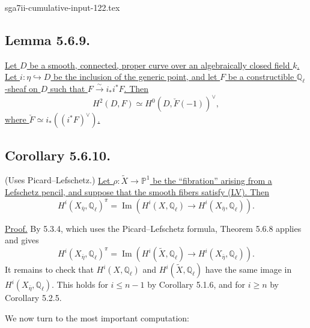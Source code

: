\begin{filecontents*}{sga7ii-cumulative-input-122.tex}
\subsection*{Lemma 5.6.9.}
\underline{Let $D$ be a smooth, connected, proper curve over an
algebraically closed field $k$.  Let $i:\eta\hookrightarrow D$ be the
inclusion of the generic point, and let $F$ be a constructible
$\mathbb Q_\ell$-sheaf on $D$ such that
$F\overset{\sim}{\longrightarrow}i_*i^*F$.  Then}
\[
H^2(D,F)\simeq H^0(D,\check F(-1))^\vee,
\]
\underline{where $\check F\simeq i_*((i^*F)^\vee)$.}

\subsection*{Corollary 5.6.10.}
\textup{(Uses Picard--Lefschetz.)}
\underline{Let $\rho:\widetilde X\to\mathbb P^1$ be the
\textquotedblleft fibration\textquotedblright{} arising from a Lefschetz
pencil, and suppose that the smooth fibers satisfy (LV).  Then}
\begin{equation}\tag{5.6.10.1}
H^i(X_{\bar\eta},\mathbb Q_\ell)^\pi
=\operatorname{Im}\!\left(
H^i(X,\mathbb Q_\ell)\longrightarrow
H^i(X_{\bar\eta},\mathbb Q_\ell)
\right).
\end{equation}

\underline{Proof.}
By 5.3.4, which uses the Picard--Lefschetz formula, Theorem 5.6.8 applies
and gives
\[
H^i(X_{\bar\eta},\mathbb Q_\ell)^\pi
=\operatorname{Im}\!\left(
H^i(\widetilde X,\mathbb Q_\ell)\longrightarrow
H^i(X_{\bar\eta},\mathbb Q_\ell)
\right).
\]
It remains to check that $H^i(X,\mathbb Q_\ell)$ and
$H^i(\widetilde X,\mathbb Q_\ell)$ have the same image in
$H^i(X_{\bar\eta},\mathbb Q_\ell)$.  This holds for $i\leq n-1$ by
Corollary 5.1.6, and for $i\geq n$ by Corollary 5.2.5.

We now turn to the most important computation:
\end{filecontents*}
